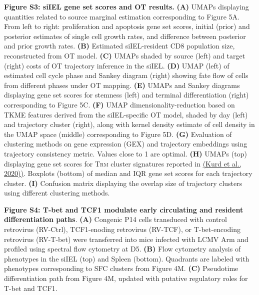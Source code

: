 \textbf{Figure S3: siIEL gene set scores and OT results.} \textbf{(A)}
UMAPs displaying quantities related to source marginal estimation
corresponding to Figure 5A. From left to right: proliferation and
apoptosis gene set scores, initial (prior) and posterior estimates of
single cell growth rates, and difference between posterior and prior
growth rates. \textbf{(B)} Estimated siIEL-resident CD8 population size,
reconstructed from OT model. \textbf{(C)} UMAPs shaded by source (left)
and target (right) costs of OT trajectory inference in the siIEL.
\textbf{(D)} UMAP (left) of estimated cell cycle phase and Sankey
diagram (right) showing fate flow of cells from different phases under
OT mapping. \textbf{(E)} UMAPs and Sankey diagrams displaying gene set
scores for stemness (left) and terminal differentiation (right)
corresponding to Figure 5C. \textbf{(F)} UMAP dimensionality-reduction
based on TKME features derived from the siIEL-specific OT model, shaded
by day (left) and trajectory cluster (right), along with kernel density
estimate of cell density in the UMAP space (middle) corresponding to
Figure 5D. \textbf{(G)} Evaluation of clustering methods on gene
expression (GEX) and trajectory embeddings using trajectory consistency
metric. Values close to 1 are optimal. \textbf{(H)} UMAPs (top)
displaying gene set scores for T\textsc{rm} cluster signatures reported
in \href{https://www.zotero.org/google-docs/?A0DdLy}{(Kurd et al.,
2020))}. Boxplots (bottom) of median and IQR gene set scores for each
trajectory cluster. \textbf{(I)} Confusion matrix displaying the overlap
size of trajectory clusters using different clustering methods.

\textbf{Figure S4: T-bet and TCF1 modulate early circulating and
resident differentiation paths}. \textbf{(A)} Congenic P14 cells
transduced with control retrovirus (RV-Ctrl), TCF1-enoding retrovirus
(RV-TCF), or T-bet-encoding retrovirus (RV-T-bet) were transferred into
mice infected with LCMV Arm and profiled using spectral flow cytometry
at D5. \textbf{(B)} Flow cytometry analysis of phenotypes in the siIEL
(top) and Spleen (bottom). Quadrants are labeled with phenotypes
corresponding to SFC clusters from Figure 4M. \textbf{(C)} Pseudotime
differentiation path from Figure 4M, updated with putative regulatory
roles for T-bet and TCF1.
